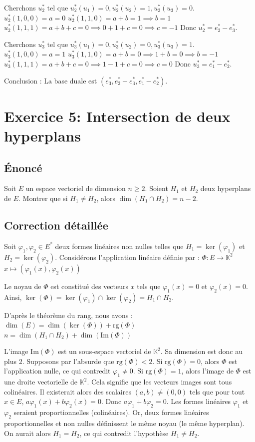 \documentclass{report}
\begin{document}
   Cherchons $u_2^*$ tel que $u_2^*(u_1)=0, u_2^*(u_2)=1, u_2^*(u_3)=0$.
   $u_2^*(1,0,0) = a = 0$
   $u_2^*(1,1,0) = a + b = 1 \implies b = 1$
   $u_2^*(1,1,1) = a + b + c = 0 \implies 0 + 1 + c = 0 \implies c = -1$
   Donc $u_2^* = e_2^* - e_3^*$.

   Cherchons $u_3^*$ tel que $u_3^*(u_1)=0, u_3^*(u_2)=0, u_3^*(u_3)=1$.
   $u_3^*(1,0,0) = a = 1$
   $u_3^*(1,1,0) = a + b = 0 \implies 1 + b = 0 \implies b = -1$
   $u_3^*(1,1,1) = a + b + c = 0 \implies 1 - 1 + c = 0 \implies c = 0$
   Donc $u_3^* = e_1^* - e_2^*$.

   Conclusion : La base duale est $(e_3^*, e_2^* - e_3^*, e_1^* - e_2^*)$.


\newpage
\chapter*{Exercice 5: Intersection de deux hyperplans}
\section*{Énoncé}
Soit $E$ un espace vectoriel de dimension $n \ge 2$. Soient $H_1$ et $H_2$ deux hyperplans de $E$.
Montrer que si $H_1 \neq H_2$, alors $\dim(H_1 \cap H_2) = n - 2$.


\section*{Correction détaillée}
Soit $\varphi_1, \varphi_2 \in E^*$ deux formes linéaires non nulles telles que $H_1 = \ker(\varphi_1)$ et $H_2 = \ker(\varphi_2)$.
Considérons l'application linéaire définie par :
$\Phi : E \to \mathbb{K}^2$
$x \mapsto (\varphi_1(x), \varphi_2(x))$

Le noyau de $\Phi$ est constitué des vecteurs $x$ tels que $\varphi_1(x) = 0$ et $\varphi_2(x) = 0$.
Ainsi, $\ker(\Phi) = \ker(\varphi_1) \cap \ker(\varphi_2) = H_1 \cap H_2$.

D'après le théorème du rang, nous avons :
$\dim(E) = \dim(\ker(\Phi)) + \text{rg}(\Phi)$
$n = \dim(H_1 \cap H_2) + \dim(\text{Im}(\Phi))$

L'image $\text{Im}(\Phi)$ est un sous-espace vectoriel de $\mathbb{K}^2$. Sa dimension est donc au plus 2.
Supposons par l'absurde que $\text{rg}(\Phi) < 2$.
Si $\text{rg}(\Phi) = 0$, alors $\Phi$ est l'application nulle, ce qui contredit $\varphi_1 \neq 0$.
Si $\text{rg}(\Phi) = 1$, alors l'image de $\Phi$ est une droite vectorielle de $\mathbb{K}^2$. Cela signifie que les vecteurs images sont tous colinéaires.
Il existerait alors des scalaires $(a, b) \neq (0,0)$ tels que pour tout $x \in E$, $a\varphi_1(x) + b\varphi_2(x) = 0$.
Donc $a\varphi_1 + b\varphi_2 = 0$. Les formes linéaires $\varphi_1$ et $\varphi_2$ seraient proportionnelles (colinéaires).
Or, deux formes linéaires proportionnelles et non nulles définissent le même noyau (le même hyperplan). On aurait alors $H_1 = H_2$, ce qui contredit l'hypothèse $H_1 \neq H_2$.
\end{document}
